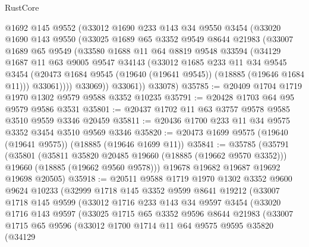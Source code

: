\begin{lexlean}{RustCore}
\begin{coremodule}
        @1692
        @145
        @9552
        (@33012
          @1690
          @233
          @143
          @34
          @9550
          @3454
          (@33020
            @1690
            @143
            @9550
            (@33025
              @1689
              @65
              @3352
              @9549
              @8644
              @21983
              (@33007
                @1689
                @65
                @9549
                (@33580
                  @1688
                  @11
                  @64
                  @8819
                  @9548
                  @33594
                  (@34129
                    @1687
                    @11
                    @63
                    @9005
                    @9547
                    @34143
                    (@33012
                      @1685
                      @233
                      @11
                      @34
                      @9545
                      @3454
                      (@20473 @1684 @9545 (@19640 (@19641 @9545)) (@18885 (@19646 @1684 @11)))
                      @33061))))
              @33069))
          @33061))
      @33078)
@35785 := @20409 @1704 @1719 @1970 @1302 @9579 @9588 @3352 @10235
@35791 := @20428 @1703 @64 @95 @9579 @9586 @3531
@35801 := @20437 @1702 @11 @63 @3757 @9578 @9585 @3510 @9559 @3346 @20459
@35811 := @20436 @1700 @233 @11 @34 @9575 @3352 @3454 @3510 @9569 @3346
@35820 := @20473 @1699 @9575 (@19640 (@19641 @9575)) (@18885 (@19646 @1699 @11))
@35841 := @35785
    (@35791
      (@35801
        (@35811 @35820 @20485 @19660 (@18885 (@19662 @9570 @3352)))
        @19660
        (@18885 (@19662 @9560 @9578)))
      @19678
      @19682
      @19687
      @19692
      @19698
      @20505)
@35918 := @20511
    @9588
    @1719
    @1970
    @1302
    @3352
    @9600
    @9624
    @10233
    (@32999
      @1718
      @145
      @3352
      @9599
      @8641
      @19212
      (@33007
        @1718
        @145
        @9599
        (@33012
          @1716
          @233
          @143
          @34
          @9597
          @3454
          (@33020
            @1716
            @143
            @9597
            (@33025
              @1715
              @65
              @3352
              @9596
              @8644
              @21983
              (@33007
                @1715
                @65
                @9596
                (@33012
                  @1700
                  @1714
                  @11
                  @64
                  @9575
                  @9595
                  @35820
                  (@34129

\end{coremodule}
\end{lexlean}
